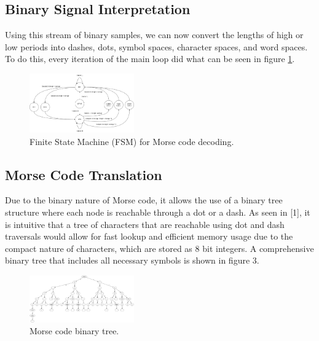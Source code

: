 \documentclass[head=13.6pt]{cce2014-design}
\begin{document}
\subsection{Binary Signal Interpretation}
Using this stream of binary samples, we can now convert the lengths of high or low periods into dashes, dots, symbol spaces, character spaces, and word spaces. To do this, every iteration of the main loop did what can be seen in figure \ref{FSM}.

\begin{figure}[h]
    \centering
    \includegraphics[width=0.4\textwidth]{images/fsm.png}
    \caption{Finite State Machine (FSM) for Morse code decoding.}
    \label{FSM}
\end{figure}

\subsection{Morse Code Translation}
Due to the binary nature of Morse code, it allows the use of a binary tree structure where each node is reachable through a dot or a dash. As seen in [1], it is intuitive that a tree of characters that are reachable using dot and dash traversals would allow for fast lookup and efficient memory usage due to the compact nature of characters, which are stored as 8 bit integers. A comprehensive binary tree that includes all necessary symbols is shown in figure 3.

\begin{figure}[h]
    \centering
    \includegraphics[width=0.4\textwidth]{images/morse_tree.png}
    \caption{Morse code binary tree.}
    \label{morsetree}
\end{figure}
\end{document}
